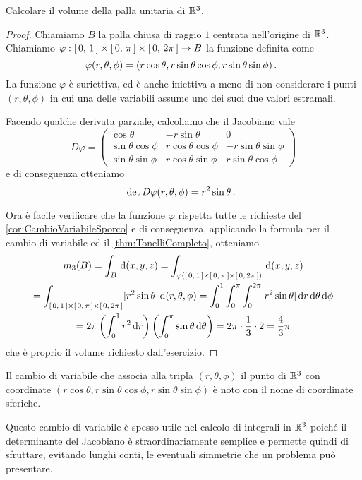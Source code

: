 \begin{exercise}
	Calcolare il volume della palla unitaria di $\mathbb R^3$.
\end{exercise}
\begin{proof}
	Chiamiamo $B$ la palla chiusa di raggio $1$ centrata nell'origine di $\mathbb R^3$.
	Chiamiamo $\varphi:\left[\,0,\,1\,\right]\times\left[\,0,\,\pi\,\right]\times\left[\,0,\,2\pi\,\right]\to B$ la funzione definita come
	\begin{equation*}
		\varphi(r,\theta,\phi)=(r\cos\theta,r\sin\theta\cos\phi,r\sin\theta\sin\phi)\, \text{. }
	\end{equation*}
	La funzione $\varphi$ è suriettiva, ed è anche iniettiva a meno di non considerare i punti $(r,\theta,\phi)$ in cui una delle variabili assume uno dei suoi due valori estramali.
	
	Facendo qualche derivata parziale, calcoliamo che il Jacobiano vale
	\begin{equation*}
		D\varphi=
		\begin{pmatrix}
		\cos\theta 			&	-r\sin\theta		&	0						\\
		\sin\theta\cos\phi	&	r\cos\theta\cos\phi	&	-r\sin\theta\sin\phi	\\
		\sin\theta\sin\phi	&	r\cos\theta\sin\phi	&	r\sin\theta\cos\phi
		\end{pmatrix}
	\end{equation*}
	e di conseguenza otteniamo
	\begin{equation*}
		\det D\varphi(r,\theta,\phi)= r^2\sin\theta \, \text{. }
	\end{equation*}
	
	Ora è facile verificare che la funzione $\varphi$ rispetta tutte le richieste del \cref{cor:CambioVariabileSporco} e di conseguenza, applicando la formula per il cambio di variabile ed il \cref{thm:TonelliCompleto}, otteniamo
	\begin{multline*}
		m_3(B)=\int_B \,\mathrm d(x,y,z)=\int_{\varphi\left(\left[\,0,\,1\,\right]\times\left[\,0,\,\pi\,\right]\times\left[\,0,\,2\pi\,\right]\right)}\,\mathrm d(x,y,z)\\
		=\int_{\left[\,0,\,1\,\right]\times\left[\,0,\,\pi\,\right]\times\left[\,0,\,2\pi\,\right]} \lvert r^2\sin\theta\rvert\,\mathrm d(r,\theta,\phi)=\int_0^1\int_0^\pi\int_0^{2\pi}\lvert r^2\sin\theta\rvert\,\mathrm d r\,\mathrm d\theta\,\mathrm d\phi\\
		=2\pi\left(\int_0^1 r^2\,\mathrm d r\right)\left(\int_0^\pi\sin\theta\,\mathrm d\theta\right)=2\pi\cdot\frac 13\cdot 2=\frac 43\pi
	\end{multline*}
	che è proprio il volume richiesto dall'esercizio.
\end{proof}
\begin{remark}\label{nota:CoordinateSferiche}
	Il cambio di variabile che associa alla tripla $(r,\theta,\phi)$ il punto di $\mathbb R^3$ con coordinate $(r\cos\theta,r\sin\theta\cos\phi,r\sin\theta\sin\phi)$ è noto con il nome di coordinate sferiche.
	
	Questo cambio di variabile è spesso utile nel calcolo di integrali in $\mathbb R^3$ poiché il determinante del Jacobiano è straordinariamente semplice e permette quindi di sfruttare, evitando lunghi conti, le eventuali simmetrie che un problema può presentare.
\end{remark}


